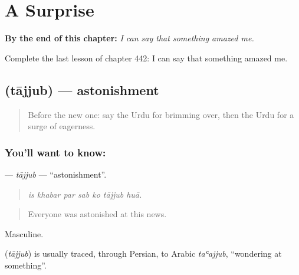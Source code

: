 
\chapter{A Surprise}
\label{ch:ur-a-surprise}

\begin{chapteropening}
\textbf{By the end of this chapter:} \emph{I can say that something amazed me.}

Complete the last lesson of chapter 442: I can say that something amazed me.
\end{chapteropening}

\section[\texorpdfstring{\ur{تعجب} (tājjub)}{تعجب (tājjub)}]{ (tājjub) — astonishment}

\label{lesson:UR-C442-tajjub}



\begin{quote}
Before the new one: say the Urdu for brimming over, then the Urdu for a surge of eagerness.
\end{quote}

\subsection*{You'll want to know: }
\textbf{} — \emph{tājjub} — \textquotedblleft{}astonishment\textquotedblright{}.

\begin{quote}
      
\end{quote}

\begin{quote}
\emph{is khabar par sab ko tājjub huā.}
\end{quote}

\begin{quote}
Everyone was astonished at this news.
\end{quote}

Masculine.

\begin{cousinweb}
\textbf{} (\emph{tājjub}) is usually traced, through Persian, to Arabic \emph{taʿajjub}, \textquotedblleft{}wondering at something\textquotedblright{}.
\end{cousinweb}

